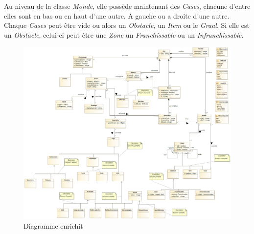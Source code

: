 Au niveau de la classe \emph{Monde}, elle possède maintenant des \emph{Cases}, chacune d'entre elles sont en bas ou en haut d'une autre. A gauche ou a droite d'une autre. Chaque \emph{Cases} peut être vide ou
alors un \emph{Obstacle}, un \emph{Item} ou le \emph{Graal}. Si elle est un \emph{Obstacle}, celui-ci peut être une \emph{Zone} un \emph{Franchissable} ou un \emph{Infranchissable}.


\begin{figure}
    \centering
	\includegraphics[width=\textwidth]{assets/Jeu}
	\caption{Diagramme enrichit}
	\label{fig:Jeu}
\end{figure}

\newpage